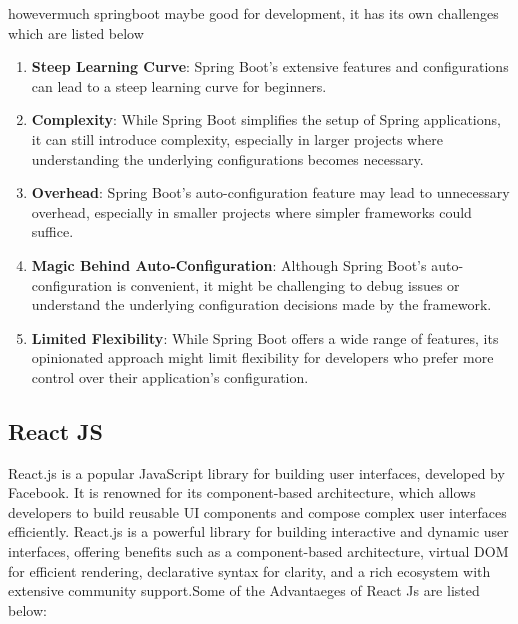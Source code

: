 \documentclass[a4paper, 12pt]{report}
\begin{document}
howevermuch springboot maybe good for development, it has its own challenges which are listed below \par 
\begin{enumerate}
  \item \textbf{Steep Learning Curve}: Spring Boot's extensive features and configurations can lead to a steep learning curve for beginners.
  
  \item \textbf{Complexity}: While Spring Boot simplifies the setup of Spring applications, it can still introduce complexity, especially in larger projects where understanding the underlying configurations becomes necessary.
  
  \item \textbf{Overhead}: Spring Boot's auto-configuration feature may lead to unnecessary overhead, especially in smaller projects where simpler frameworks could suffice.
  
  \item \textbf{Magic Behind Auto-Configuration}: Although Spring Boot's auto-configuration is convenient, it might be challenging to debug issues or understand the underlying configuration decisions made by the framework.
  
  \item \textbf{Limited Flexibility}: While Spring Boot offers a wide range of features, its opinionated approach might limit flexibility for developers who prefer more control over their application's configuration.
\end{enumerate}
\subsection{React JS}
\noindent React.js is a popular JavaScript library for building user interfaces, developed by Facebook. It is renowned for its component-based architecture, which allows developers to build reusable UI components and compose complex user interfaces efficiently.
 React.js is a powerful library for building interactive and dynamic user interfaces, offering benefits such as a component-based architecture, virtual DOM for efficient rendering, declarative syntax for clarity, and a rich ecosystem with extensive community support.Some of the Advantaeges of React Js are listed below:
 
\end{document}
